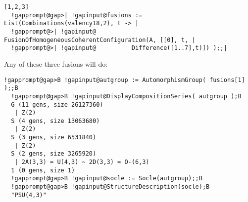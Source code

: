 \documentclass[a4paper,11pt]{report}
\begin{document}
{{\begin{Verbatim}[commandchars=!@|,fontsize=\small,frame=single,label=Example]
  [1,2,3]
  !gapprompt@gap>| !gapinput@fusions := List(Combinations(valency18,2), t -> |
  !gapprompt@>| !gapinput@		FusionOfHomogeneousCoherentConfiguration(A, [[0], t, |
  !gapprompt@>| !gapinput@			Difference([1..7],t)]) );;|
\end{Verbatim}
 Any of these three fusions will do: 
\begin{Verbatim}[commandchars=!@B,fontsize=\small,frame=single,label=Example]
  !gapprompt@gap>B !gapinput@autgroup := AutomorphismGroup( fusions[1] );;B
  !gapprompt@gap>B !gapinput@DisplayCompositionSeries( autgroup );B
  G (11 gens, size 26127360)
   | Z(2)
  S (4 gens, size 13063680)
   | Z(2)
  S (3 gens, size 6531840)
   | Z(2)
  S (2 gens, size 3265920)
   | 2A(3,3) = U(4,3) ~ 2D(3,3) = O-(6,3)
  1 (0 gens, size 1)
  !gapprompt@gap>B !gapinput@socle := Socle(autgroup);;B
  !gapprompt@gap>B !gapinput@StructureDescription(socle);B
  "PSU(4,3)"
\end{Verbatim}
 }

 
}
\end{document}
